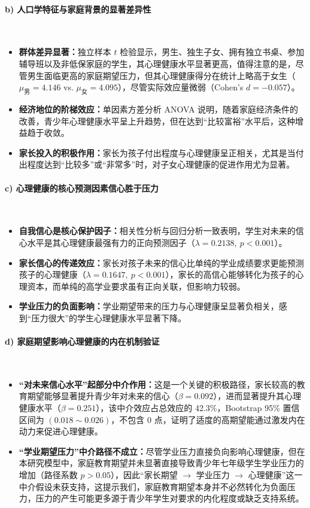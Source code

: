 \documentclass[zihao = -4, linespread = 1.5]{article}
\begin{document}
\paragraph*{b) 人口学特征与家庭背景的显著差异性}~{}

\begin{itemize}
    \item \textbf{群体差异显著：}独立样本 $t$ 检验显示，男生、独生子女、拥有独立书桌、参加辅导班以及非低保家庭的学生，其心理健康水平显著更高，值得注意的是，尽管男生面临更高的家庭期望压力，但其心理健康得分在统计上略高于女生（$\mu_{\text{男}}=4.146$ vs. $\mu_{\text{女}}=4.095$），尽管实际效应量微弱（Cohen's $d=-0.057$）。
    \item \textbf{经济地位的阶梯效应：}单因素方差分析 ANOVA 说明，随着家庭经济条件的改善，青少年心理健康水平呈上升趋势，但在达到“比较富裕”水平后，这种增益趋于收敛。
    \item \textbf{家长投入的积极作用：}家长为孩子付出程度与心理健康呈正相关，尤其是当付出程度达到“比较多”或“非常多”时，对子女心理健康的促进作用尤为显著。
\end{itemize}

\paragraph*{c) 心理健康的核心预测因素信心胜于压力}~{}

\begin{itemize}
    \item \textbf{自我信心是核心保护因子：}相关性分析与回归分析一致表明，学生对未来的信心水平是其心理健康最强有力的正向预测因子（$\lambda=0.2138,\ p<0.001$）。
    \item \textbf{家长信心的传递效应：}家长对孩子未来的信心比单纯的学业成绩要求更能预测孩子的心理健康（$\lambda=0.1647,\ p<0.001$），家长的高信心能够转化为孩子的心理资本，而单纯的高学业要求虽有正向关联，但影响力较弱。
    \item \textbf{学业压力的负面影响：}学业期望带来的压力与心理健康呈显著负相关，感到“压力很大”的学生心理健康水平显著下降。
\end{itemize}

\paragraph*{d) 家庭期望影响心理健康的内在机制验证}~{}

\begin{itemize}
    \item \textbf{“对未来信心水平”起部分中介作用：}这是一个关键的积极路径，家长较高的教育期望能够显著提升青少年对未来的信心（$\beta=0.092$），进而显著提升其心理健康水平（$\beta=0.251$），该中介效应占总效应的 42.3\%，Bootstrap 95\% 置信区间为 $(0.018\sim0.026)$，不包含 0 点，证明了适度的高期望能通过激发内在动力来促进心理健康。
    \item \textbf{“学业期望压力”中介路径不成立：}尽管学业压力直接负向影响心理健康，但在本研究模型中，家庭教育期望并未显著直接导致青少年七年级学生学业压力的增加（路径系数 $p>0.05$），因此“家长期望 $\rightarrow$ 学业压力 $\rightarrow$ 心理健康”这一中介假设未获支持，这提示我们，家庭教育期望本身并不必然转化为负面压力，压力的产生可能更多源于青少年学生对要求的内化程度或缺乏支持系统。
\end{itemize}
\end{document}
